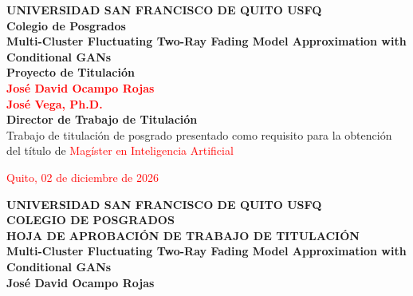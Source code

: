 \begin{center}
    \textbf{\fontsize{14}{16}\selectfont UNIVERSIDAD SAN FRANCISCO DE QUITO USFQ}\\
    \vspace{40pt}
    \textbf{\fontsize{14}{16}\selectfont Colegio de Posgrados}\\
    \vspace{90pt}
    \textbf{\fontsize{14}{16}\selectfont Multi-Cluster Fluctuating Two-Ray Fading Model Approximation with Conditional GANs}\\
    \vspace{60pt}
    \textbf{\fontsize{14}{16}\selectfont Proyecto de Titulación}\\
    \vspace{90pt}
    \textbf{\fontsize{18}{20}\selectfont \textcolor{red}{José David Ocampo Rojas}}\\
    \vspace{70pt}
    \textbf{\fontsize{16}{18}\selectfont \textcolor{red}{José Vega, Ph.D.}}\\
    \vspace{15pt}
    \textbf{\fontsize{16}{18}\selectfont Director de Trabajo de Titulación}\\
    \vspace{90pt}
    \fontsize{12}{14}\selectfont Trabajo de titulación de posgrado presentado como requisito para la obtención del título de \textcolor{red}{Magíster en Inteligencia Artificial}
    \vspace{40pt}
\end{center}

\begin{center}
    \fontsize{12}{14}\selectfont \textcolor{red}{Quito, 02 de diciembre de 2026}
\end{center}

\newpage

\begin{center}
    \textbf{\fontsize{18}{16}\selectfont UNIVERSIDAD SAN FRANCISCO DE QUITO USFQ}\\
    \vspace{10pt}
    \textbf{\fontsize{18}{16}\selectfont COLEGIO DE POSGRADOS}\\
    \vspace{20pt}
    \textbf{\fontsize{14}{16}\selectfont HOJA DE APROBACIÓN DE TRABAJO DE TITULACIÓN}\\
    \vspace{10pt}
    \textbf{\fontsize{14}{16}\selectfont Multi-Cluster Fluctuating Two-Ray Fading Model Approximation with Conditional GANs}\\
    \vspace{10pt}
    \textbf{\fontsize{14}{16}\selectfont José David Ocampo Rojas}
\end{center}
\vspace{20pt}

